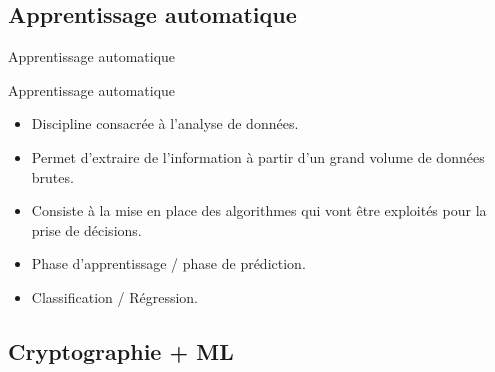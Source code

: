 \documentclass{beamer}
\begin{document}
  \subsection{Apprentissage automatique}
 
  \begin{frame}{Apprentissage automatique}
  \begin{block}{Apprentissage automatique}
  \begin{itemize}
    \item{Discipline consacrée à l'analyse de données.}
  	\item{Permet d'extraire de l'information à partir d'un grand volume de données brutes.}
    \item{Consiste à la mise en place des algorithmes qui vont être exploités	 pour la prise de décisions.}
    \item{Phase d'apprentissage / phase de prédiction.}
    \item{Classification / Régression.}
  \end{itemize}
  \end{block}
    \end{frame}
  \subsection{Cryptographie + ML}
  
\end{document}
